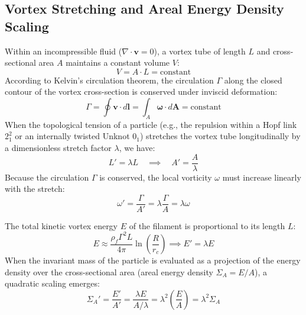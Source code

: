 \documentclass[10pt]{article}
\begin{document}
    \subsection{Vortex Stretching and Areal Energy Density Scaling}

        Within an incompressible fluid ($\nabla \cdot \mathbf{v} = 0$), a vortex tube of length $L$ and cross-sectional area $A$ maintains a constant volume $V$:
        \begin{equation}
            V = A \cdot L = \text{constant}
        \end{equation}
        According to Kelvin's circulation theorem, the circulation $\Gamma$ along the closed contour of the vortex cross-section is conserved under inviscid deformation:
        \begin{equation}
            \Gamma = \oint \mathbf{v} \cdot d\mathbf{l} = \int_{A} \boldsymbol{\omega} \cdot d\mathbf{A} = \text{constant}
        \end{equation}
        When the topological tension of a particle (e.g., the repulsion within a Hopf link $2^2_1$ or an internally twisted Unknot $0_1$) stretches the vortex tube longitudinally by a dimensionless stretch factor $\lambda$, we have:
        \begin{equation}
            L' = \lambda L \quad \implies \quad A' = \frac{A}{\lambda}
        \end{equation}
        Because the circulation $\Gamma$ is conserved, the local vorticity $\omega$ must increase linearly with the stretch:
        \begin{equation}
            \omega' = \frac{\Gamma}{A'} = \lambda \frac{\Gamma}{A} = \lambda \omega
        \end{equation}

        The total kinetic vortex energy $E$ of the filament is proportional to its length $L$:
        \begin{equation}
            E \approx \frac{\rho_{\!f} \Gamma^2 L}{4\pi} \ln\left(\frac{R}{r_c}\right) \implies E' = \lambda E
        \end{equation}
        When the invariant mass of the particle is evaluated as a projection of the energy density over the cross-sectional area (areal energy density $\Sigma_A = E / A$), a quadratic scaling emerges:
        \begin{equation}
            \Sigma_A' = \frac{E'}{A'} = \frac{\lambda E}{A / \lambda} = \lambda^2 \left(\frac{E}{A}\right) = \lambda^2 \Sigma_A
        \end{equation}
\end{document}

